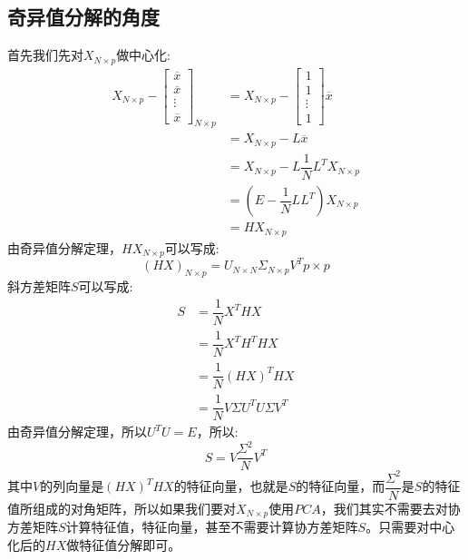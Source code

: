 \documentclass[withoutpreface,bwprint]{cumcmthesis} %
\begin{document}
	\subsection{\Large 奇异值分解的角度}
	首先我们先对$X_{N\times p}$做中心化:
	\begin{align*}
		X_{N\times p}-\left[
			\begin{array}{c}
				\overline{x}\\
				\overline{x}\\
				\vdots\\
				\overline{x}
			\end{array}
		\right]_{N \times p}
		& =X_{N \times p}-\left[
			\begin{array}{c}
				1\\
				1\\
				\vdots\\
				1
			\end{array}
		\right]\overline{x}\\
		&=X_{N \times p}-L\overline{x} \\
		&=X_{N \times p}-L\dfrac{1}{N}L^TX_{N \times p}\\
		&=\left( E-\dfrac{1}{N}LL^T\right)X_{N\times p} \\
		&=HX_{N\times p}		
	\end{align*}
	由奇异值分解定理，$HX_{N \times p}$可以写成:
	\begin{equation}
		\left(HX\right)_{N\times p}=U_{N\times N} \Sigma_{N\times p} V^T{p \times p}
	\end{equation}
	斜方差矩阵$S$可以写成:
	\begin{align*}
		S & =\dfrac{1}{N}X^THX \\
		  &=\dfrac{1}{N} X^T H^T H X \\
		  &=\dfrac{1}{N} (HX)^T HX \\
		  &=\dfrac{1}{N}  V \Sigma U^T U \Sigma V^T 
	\end{align*}
	由奇异值分解定理，所以$U^TU=E$，所以:
	\begin{equation}
		S=V \dfrac{\Sigma^2}{N}  V^T
	\end{equation}
	其中$V$的列向量是$(HX)^THX$的特征向量，也就是$S$的特征向量，而$\dfrac{\Sigma^2}{N}$是$S$的特征值所组成的对角矩阵，所以如果我们要对$X_{N\times p}$使用$PCA$，我们其实不需要去对协方差矩阵$S$计算特征值，特征向量，甚至不需要计算协方差矩阵$S$。只需要对中心化后的$HX$做特征值分解即可。
\end{document}
